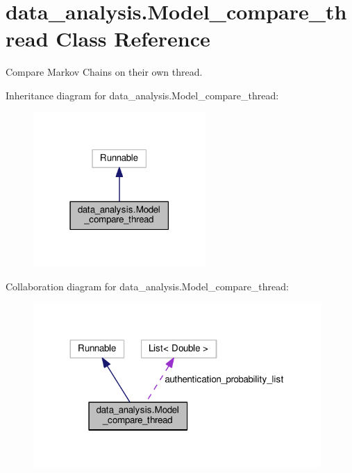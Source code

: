 \hypertarget{classdata__analysis_1_1_model__compare__thread}{}\section{data\+\_\+analysis.\+Model\+\_\+compare\+\_\+thread Class Reference}
\label{classdata__analysis_1_1_model__compare__thread}


Compare Markov Chains on their own thread.  




Inheritance diagram for data\+\_\+analysis.\+Model\+\_\+compare\+\_\+thread\+:\nopagebreak
\begin{figure}[H]
\begin{center}
\leavevmode
\includegraphics[width=186pt]{classdata__analysis_1_1_model__compare__thread__inherit__graph}
\end{center}
\end{figure}


Collaboration diagram for data\+\_\+analysis.\+Model\+\_\+compare\+\_\+thread\+:\nopagebreak
\begin{figure}[H]
\begin{center}
\leavevmode
\includegraphics[width=311pt]{classdata__analysis_1_1_model__compare__thread__coll__graph}
\end{center}
\end{figure}
